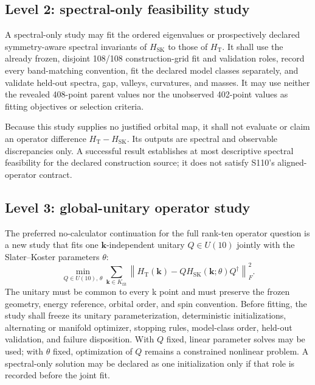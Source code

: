 \documentclass[11pt]{article}
\begin{document}
\subsection{Level 2: spectral-only feasibility study}

A spectral-only study may fit the ordered eigenvalues or prospectively declared
symmetry-aware spectral invariants of $H_{\mathrm{SK}}$ to those of $H_{\mathrm{T}}$.
It shall use the already frozen, disjoint 108/108 construction-grid fit and validation
roles, record every band-matching convention, fit the declared model classes separately,
and validate held-out spectra, gap, valleys, curvatures, and masses.  It may use neither
the revealed 408-point parent values nor the unobserved 402-point values as fitting
objectives or selection criteria.

Because this study supplies no justified orbital map, it shall not evaluate or claim an
operator difference $H_{\mathrm{T}}-H_{\mathrm{SK}}$.  Its outputs are spectral and
observable discrepancies only.  A successful result establishes at most descriptive
spectral feasibility for the declared construction source; it does not satisfy S110's
aligned-operator contract.

\subsection{Level 3: global-unitary operator study}

The preferred no-calculator continuation for the full rank-ten operator question is a
new study that fits one $\mathbf{k}$-independent unitary $Q\in U(10)$ jointly with the
Slater--Koster parameters $\theta$:
\begin{equation}
 \min_{Q\in U(10),\,\theta}
 \sum_{\mathbf{k}\in K_{\mathrm{fit}}}
 \left\|
 H_{\mathrm{T}}(\mathbf{k})-
 QH_{\mathrm{SK}}(\mathbf{k};\theta)Q^{\dagger}
 \right\|_{F}^{2}.
\end{equation}
The unitary must be common to every k point and must preserve the frozen geometry,
energy reference, orbital order, and spin convention.  Before fitting, the study shall
freeze its unitary parameterization, deterministic initializations, alternating or
manifold optimizer, stopping rules, model-class order, held-out validation, and failure
disposition.  With $Q$ fixed, linear parameter solves may be used; with $\theta$ fixed,
optimization of $Q$ remains a constrained nonlinear problem.  A spectral-only solution
may be declared as one initialization only if that role is recorded before the joint
fit.
\end{document}
